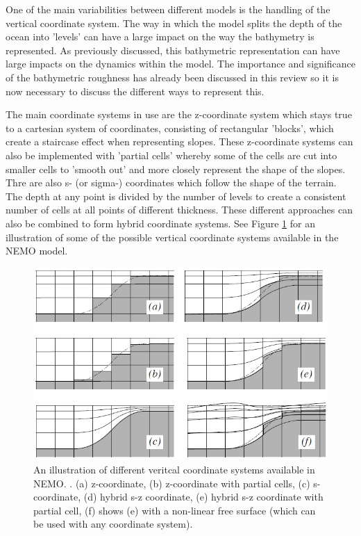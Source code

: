 \documentclass[..\EOYR.tex]{subfiles}
\begin{document}
	One of the main variabilities between different models is the handling of the vertical coordinate system. The way in which the model splits the depth of the ocean into 'levels' can have a large impact on the way the bathymetry is represented. As previously discussed, this bathymetric representation can have large impacts on the dynamics within the model. The importance and significance of the bathymetric roughness has already been discussed in this review so it is now necessary to discuss the different ways to represent this.
    \par
The main coordinate systems in use are the z-coordinate system which stays true to a cartesian system of coordinates, consisting of rectangular 'blocks', which create a staircase effect when representing slopes. These z-coordinate systems can also be implemented with 'partial cells' whereby some of the cells are cut into smaller cells to 'smooth out' and more closely represent the shape of the slopes. Thre are also s- (or sigma-) coordinates which follow the shape of the terrain. The depth at any point is divided by the number of levels to create a consistent number of cells at all points of different thickness. These different approaches can also be combined to form hybrid coordinate systems. See Figure \ref{FIG:Coords} for an illustration of some of the possible vertical coordinate systems available in the NEMO model.

\begin{figure}[t]
  \includegraphics[width=\linewidth]{Figures/NEMOP58.jpg}
  \caption{An illustration of different veritcal coordinate systems available in NEMO. \citep{Madec2011}. (a) z-coordinate, (b) z-coordinate with partial cells, (c) s-coordinate, (d) hybrid s-z coordinate, (e) hybrid s-z coordinate with partial cell, (f) shows (e) with a non-linear free surface (which can be used with any coordinate system).}
  \label{FIG:Coords}
\end{figure}
\end{document}
